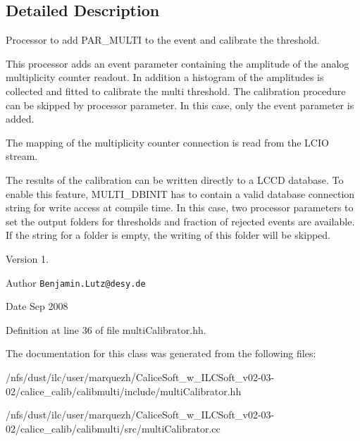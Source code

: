 \subsection{Detailed Description}
Processor to add P\-A\-R\-\_\-\-M\-U\-L\-T\-I to the event and calibrate the threshold. 

This processor adds an event parameter containing the amplitude of the analog multiplicity counter readout. In addition a histogram of the amplitudes is collected and fitted to calibrate the multi threshold. The calibration procedure can be skipped by processor parameter. In this case, only the event parameter is added.

The mapping of the multiplicity counter connection is read from the L\-C\-I\-O stream.

The results of the calibration can be written directly to a L\-C\-C\-D database. To enable this feature, M\-U\-L\-T\-I\-\_\-\-D\-B\-I\-N\-I\-T has to contain a valid database connection string for write access at compile time. In this case, two processor parameters to set the output folders for thresholds and fraction of rejected events are available. If the string for a folder is empty, the writing of this folder will be skipped.

\begin{DoxyVersion}{Version}
1. 
\end{DoxyVersion}
\begin{DoxyAuthor}{Author}
{\tt Benjamin.\-Lutz@desy.\-de} 
\end{DoxyAuthor}
\begin{DoxyDate}{Date}
Sep 2008 
\end{DoxyDate}


Definition at line 36 of file multi\-Calibrator.\-hh.



The documentation for this class was generated from the following files\-:\begin{DoxyCompactItemize}
\item 
/nfs/dust/ilc/user/marquezh/\-Calice\-Soft\-\_\-w\-\_\-\-I\-L\-C\-Soft\-\_\-v02-\/03-\/02/calice\-\_\-calib/calibmulti/include/multi\-Calibrator.\-hh\item 
/nfs/dust/ilc/user/marquezh/\-Calice\-Soft\-\_\-w\-\_\-\-I\-L\-C\-Soft\-\_\-v02-\/03-\/02/calice\-\_\-calib/calibmulti/src/multi\-Calibrator.\-cc\end{DoxyCompactItemize}

